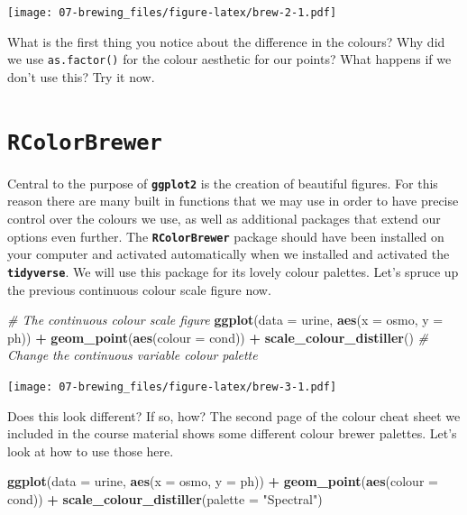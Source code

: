\documentclass[
]{book}
\newenvironment{Shaded}{\begin{snugshade}}{\end{snugshade}}
\newcommand{\CommentTok}[1]{\textcolor[rgb]{0.56,0.35,0.01}{\textit{#1}}}
\newcommand{\DataTypeTok}[1]{\textcolor[rgb]{0.13,0.29,0.53}{#1}}
\newcommand{\KeywordTok}[1]{\textcolor[rgb]{0.13,0.29,0.53}{\textbf{#1}}}
\newcommand{\NormalTok}[1]{#1}
\newcommand{\OperatorTok}[1]{\textcolor[rgb]{0.81,0.36,0.00}{\textbf{#1}}}
\newcommand{\StringTok}[1]{\textcolor[rgb]{0.31,0.60,0.02}{#1}}
\begin{document}
\texttt{[image: 07-brewing\_files/figure-latex/brew-2-1.pdf]}

What is the first thing you notice about the difference in the colours? Why did we use \texttt{as.factor()} for the colour aesthetic for our points? What happens if we don't use this? Try it now.

\hypertarget{rcolorbrewer}{%
\section{\texorpdfstring{\textbf{\texttt{RColorBrewer}}}{RColorBrewer}}\label{rcolorbrewer}}

Central to the purpose of \textbf{\texttt{ggplot2}} is the creation of beautiful figures. For this reason there are many built in functions that we may use in order to have precise control over the colours we use, as well as additional packages that extend our options even further. The \textbf{\texttt{RColorBrewer}} package should have been installed on your computer and activated automatically when we installed and activated the \textbf{\texttt{tidyverse}}. We will use this package for its lovely colour palettes. Let's spruce up the previous continuous colour scale figure now.

\begin{Shaded}
\begin{Highlighting}[]
\CommentTok{\# The continuous colour scale figure}
\KeywordTok{ggplot}\NormalTok{(}\DataTypeTok{data =}\NormalTok{ urine, }\KeywordTok{aes}\NormalTok{(}\DataTypeTok{x =}\NormalTok{ osmo, }\DataTypeTok{y =}\NormalTok{ ph)) }\OperatorTok{+}
\StringTok{  }\KeywordTok{geom\_point}\NormalTok{(}\KeywordTok{aes}\NormalTok{(}\DataTypeTok{colour =}\NormalTok{ cond)) }\OperatorTok{+}
\StringTok{  }\KeywordTok{scale\_colour\_distiller}\NormalTok{() }\CommentTok{\# Change the continuous variable colour palette}
\end{Highlighting}
\end{Shaded}

\texttt{[image: 07-brewing\_files/figure-latex/brew-3-1.pdf]}

Does this look different? If so, how? The second page of the colour cheat sheet we included in the course material shows some different colour brewer palettes. Let's look at how to use those here.

\begin{Shaded}
\begin{Highlighting}[]
\KeywordTok{ggplot}\NormalTok{(}\DataTypeTok{data =}\NormalTok{ urine, }\KeywordTok{aes}\NormalTok{(}\DataTypeTok{x =}\NormalTok{ osmo, }\DataTypeTok{y =}\NormalTok{ ph)) }\OperatorTok{+}
\StringTok{  }\KeywordTok{geom\_point}\NormalTok{(}\KeywordTok{aes}\NormalTok{(}\DataTypeTok{colour =}\NormalTok{ cond)) }\OperatorTok{+}
\StringTok{  }\KeywordTok{scale\_colour\_distiller}\NormalTok{(}\DataTypeTok{palette =} \StringTok{"Spectral"}\NormalTok{)}
\end{Highlighting}
\end{Shaded}
\end{document}
